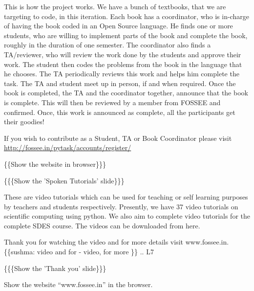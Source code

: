 \documentclass[a4paper,english]{article}
\begin{document}
This is how the project works. We have a bunch of textbooks, that we are targeting to code, in this iteration. Each book has a coordinator, who is in-charge of having the book coded in an Open Source language. He finds one or more students, who are willing to implement parts of the book and complete the book, roughly in the duration of one semester. The coordinator also finds a TA/reviewer, who will review the work done by the students and approve their work. The student then codes the problems from the book in the language that he chooses. The TA periodically reviews this work and helps him complete the task. The TA and student meet up in person, if and when required. Once the book is completed, the TA and the coordinator together, announce that the book is complete. This will then be reviewed by a member from FOSSEE and confirmed. Once, this work is announced as complete, all the participants get their goodies!

If you wish to contribute as a Student, TA or Book Coordinator please visit \url{http://fossee.in/pytask/accounts/register/}


\{\{Show the website in browser\}\}\}

\{\{\{Show the 'Spoken Tutorials' slide\}\}\}


These are video tutorials which can be used for teaching or self learning purposes by teachers and students respectively. Presently, we have 37 video tutorials on scientific computing using python. We also aim to complete video tutorials for the complete SDES course. The videos can be downloaded from here.

Thank you for watching the video and for more details visit www.fossee.in.
\{\{sushma: video and for - video, for more \}\}
.. L7

\{\{\{Show the 'Thank you' slide\}\}\}

Show the website ``www.fossee.in'' in the browser.
\end{document}
